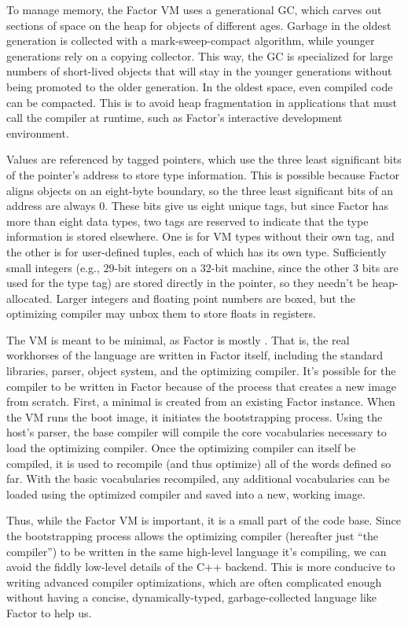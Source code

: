 To manage memory, the Factor \gls{VM} uses a generational \gls{GC}, which
carves out sections of space on the heap for objects of different ages.
Garbage in the oldest generation is collected with a mark-sweep-compact
algorithm, while younger generations rely on a copying collector.
This way, the \gls{GC} is specialized for large numbers of short-lived objects
that will stay in the younger generations without being promoted to the older
generation.  In the oldest space, even compiled code can be compacted.  This is
to avoid heap fragmentation in applications that must call the compiler at
runtime, such as Factor's interactive development environment.

Values are referenced by tagged pointers, which use the three least significant
bits of the pointer's address to store type information.  This is possible
because Factor aligns objects on an eight-byte boundary, so the three least
significant bits of an address are always $0$.  These bits give us eight unique
tags, but since Factor has more than eight data types, two tags are reserved to
indicate that the type information is stored elsewhere.  One is for \gls{VM}
types without their own tag, and the other is for user-defined tuples, each of
which has its own type.  Sufficiently small integers (e.g., $29$-bit integers
on a $32$-bit machine, since the other $3$ bits are used for the type tag) are
stored directly in the pointer, so they needn't be heap-allocated.  Larger
integers and floating point numbers are boxed, but the optimizing compiler may
unbox them to store floats in registers.

The \gls{VM} is meant to be minimal, as Factor is mostly .
That is, the real workhorses of the language are written in Factor itself,
including the standard libraries, parser, object system, and the optimizing
compiler.  It's possible for the compiler to be written in Factor because of
the  process that creates a new image from scratch.  First,
a minimal  is created from an existing  Factor
instance.  When the \gls{VM} runs the boot image, it initiates the
bootstrapping process.  Using the host's parser, the base compiler will compile
the core vocabularies necessary to load the optimizing compiler.  Once the
optimizing compiler can itself be compiled, it is used to recompile (and thus
optimize) all of the words defined so far.  With the basic vocabularies
recompiled, any additional vocabularies can be loaded using the optimized
compiler and saved into a new, working image.

Thus, while the Factor \gls{VM} is important, it is a small part of the code
base.  Since the bootstrapping process allows the optimizing compiler
(hereafter just ``the compiler'') to be written in the same high-level language
it's compiling, we can avoid the fiddly low-level details of the C++ backend.
This is more conducive to writing advanced compiler optimizations, which are
often complicated enough without having a concise, dynamically-typed,
garbage-collected language like Factor to help us.
